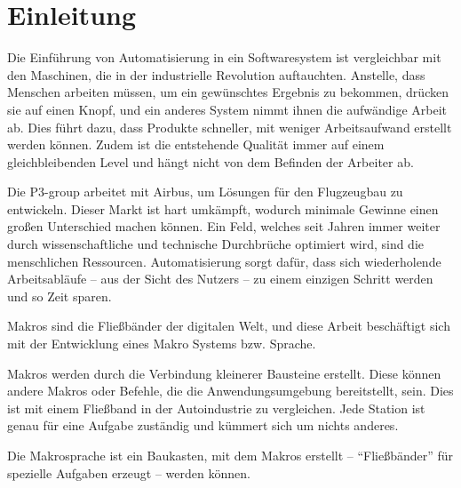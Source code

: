




\tableofcontents
\newpage

\section{Einleitung}
\label{sec:einleitung}
  Die Einführung von Automatisierung in ein Softwaresystem ist vergleichbar mit den Maschinen, die in der industrielle Revolution auftauchten. Anstelle, dass Menschen arbeiten müssen, um ein gewünschtes Ergebnis zu bekommen, drücken sie auf einen Knopf, und ein anderes System nimmt ihnen die aufwändige Arbeit ab. Dies führt dazu, dass Produkte schneller, mit weniger Arbeitsaufwand erstellt werden können. Zudem ist die entstehende Qualität immer auf einem gleichbleibenden Level und hängt nicht von dem Befinden der Arbeiter ab.

  Die P3-group arbeitet mit Airbus, um Lösungen für den Flugzeugbau zu entwickeln. Dieser Markt ist hart umkämpft, wodurch minimale Gewinne einen großen Unterschied machen können. Ein Feld, welches seit Jahren immer weiter durch wissenschaftliche und technische Durchbrüche optimiert wird, sind die menschlichen Ressourcen. Automatisierung sorgt dafür, dass sich wiederholende Arbeitsabläufe -- aus der Sicht des Nutzers -- zu einem einzigen Schritt werden und so Zeit sparen.

  Makros sind die Fließbänder der digitalen Welt, und diese Arbeit beschäftigt sich mit der Entwicklung eines Makro Systems bzw. Sprache.

  Makros werden durch die Verbindung kleinerer Bausteine erstellt. Diese können andere Makros oder Befehle, die die Anwendungsumgebung bereitstellt, sein. Dies ist mit einem Fließband in der Autoindustrie zu vergleichen. Jede Station ist genau für eine Aufgabe zuständig und kümmert sich um nichts anderes.

  Die Makrosprache ist ein Baukasten, mit dem Makros erstellt -- ``Fließbänder'' für spezielle Aufgaben erzeugt -- werden können.



